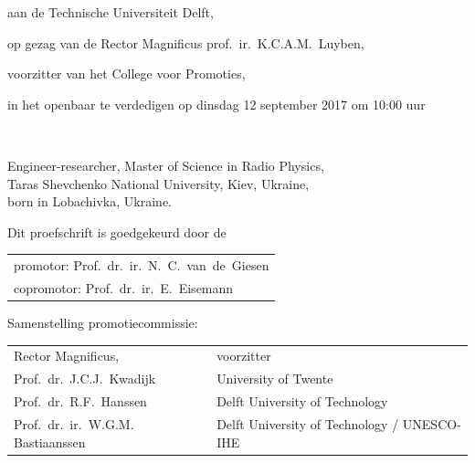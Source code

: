 \begin{titlepage}
\begin{center}
	aan de Technische Universiteit Delft,
	
	op gezag van de Rector Magnificus prof.~ir.~K.C.A.M.~Luyben,
	
	voorzitter van het College voor Promoties,
	
	in het openbaar te verdedigen op dinsdag 12 september 2017 om 10:00 uur
	
	\bigskip
	\bigskip
	
	
	\bigskip
	\bigskip
	
	\makeatletter
	{\Large\titlefont\bfseries\@firstname\ {\titleshape\@lastname}}
	\makeatother
	
	\bigskip
	\bigskip
	
	Engineer-researcher, Master of Science in Radio Physics, \\
	Taras Shevchenko National University, Kiev, Ukraine, \\
	born in Lobachivka, Ukraine.
	
	\vspace*{2\bigskipamount}
	
\end{center}

\clearpage
\thispagestyle{empty}

\noindent Dit proefschrift is goedgekeurd door de

\medskip\noindent
\begin{tabular}{l}
	promotor: Prof.\ dr.\ ir.\ N.\ C.\ van\ de\ Giesen \\
	copromotor: Prof.\ dr.\ ir.\ E.\ Eisemann
\end{tabular}

\bigskip
\noindent Samenstelling promotiecommissie:

\medskip\noindent
\begin{tabular}{p{5cm}l}
	Rector Magnificus, & voorzitter \\
	
	Prof.\ dr.\ J.C.J.\ Kwadijk & University of Twente \\
	
	Prof.\ dr.\ R.F.\ Hanssen & Delft University of Technology \\
	
	Prof.\ dr.\ ir.\ W.G.M. Bastiaanssen & Delft University of Technology / UNESCO-IHE \\
	

\end{tabular}
\end{titlepage}
